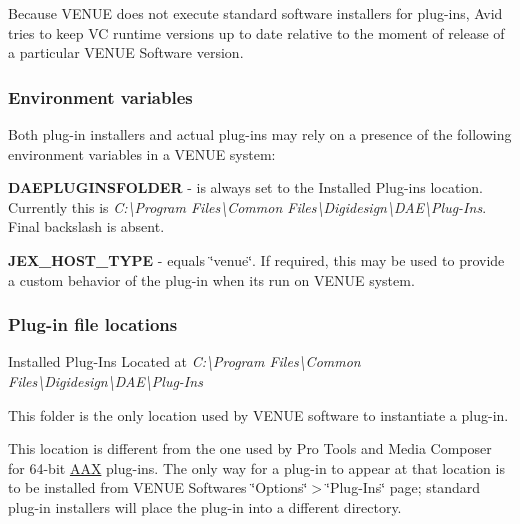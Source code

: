  Because V\+E\+N\+U\+E does not execute standard software installers for plug-\/ins, Avid tries to keep V\+C runtime versions up to date relative to the moment of release of a particular V\+E\+N\+U\+E Software version.

\hypertarget{a00377_subsection__aax_venue_guide__system_details__environment_vars}{}\subsubsection{Environment variables}\label{a00377_subsection__aax_venue_guide__system_details__environment_vars}
 Both plug-\/in installers and actual plug-\/ins may rely on a presence of the following environment variables in a V\+E\+N\+U\+E system\+: 
\begin{DoxyItemize}
\item {\bfseries {\ttfamily D\+A\+E\+P\+L\+U\+G\+I\+N\+S\+F\+O\+L\+D\+E\+R}} -\/ is always set to the Installed Plug-\/ins location. Currently this is {\itshape C\+:\textbackslash{}Program Files\textbackslash{}Common Files\textbackslash{}Digidesign\textbackslash{}D\+A\+E\textbackslash{}Plug-\/\+Ins}. Final backslash is absent.  
\item {\bfseries {\ttfamily J\+E\+X\+\_\+\+H\+O\+S\+T\+\_\+\+T\+Y\+P\+E}} -\/ equals \char`\"{}venue\char`\"{}. If required, this may be used to provide a custom behavior of the plug-\/in when it\textquotesingle{}s run on V\+E\+N\+U\+E system.  
\end{DoxyItemize}

\hypertarget{a00377_subsection__aax_venue_guide__system_details__plugin_locations}{}\subsubsection{Plug-\/in file locations}\label{a00377_subsection__aax_venue_guide__system_details__plugin_locations}
 Installed Plug-\/\+Ins Located at {\itshape C\+:\textbackslash{}Program Files\textbackslash{}Common Files\textbackslash{}Digidesign\textbackslash{}D\+A\+E\textbackslash{}Plug-\/\+Ins}

 This folder is the only location used by V\+E\+N\+U\+E software to instantiate a plug-\/in.

 This location is different from the one used by Pro Tools and Media Composer for 64-\/bit \hyperlink{a00288}{A\+A\+X} plug-\/ins. The only way for a plug-\/in to appear at that location is to be installed from V\+E\+N\+U\+E Software\textquotesingle{}s \char`\"{}\+Options\char`\"{}$>$\char`\"{}\+Plug-\/\+Ins\char`\"{} page; standard plug-\/in installers will place the plug-\/in into a different directory.

